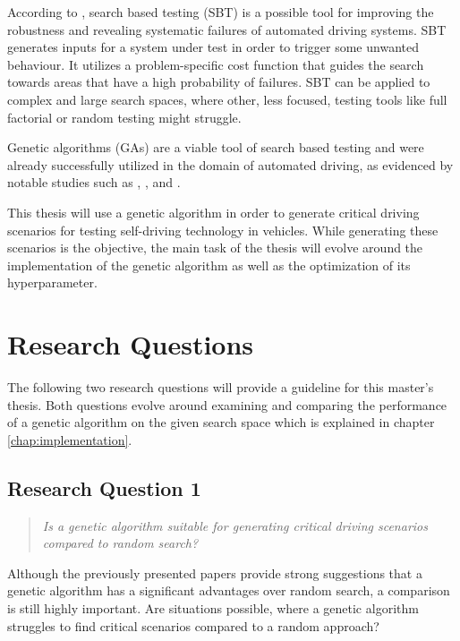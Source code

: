 According to \cite{kluck_search-based_2022}, search based testing (SBT) is a possible tool for improving the robustness and revealing systematic failures of automated driving systems. SBT generates inputs for a system under test in order to trigger some unwanted behaviour. It utilizes a problem-specific cost function that guides the search towards areas that have a high probability of failures. SBT can be applied to complex and large search spaces, where other, less focused, testing tools like full factorial or random testing might struggle.

Genetic algorithms (GAs) are a viable tool of search based testing and were already successfully utilized in the domain of automated driving, as evidenced by notable studies such as \cite{klampfl_using_nodate}, \cite{felbinger_comparing_2019}, \cite{kaufmann_critical_2021} and \cite{almanee_scenorita_2021}. 

This thesis will use a genetic algorithm in order to generate critical driving scenarios for testing self-driving technology in vehicles. While generating these scenarios is the objective, the main task of the thesis will evolve around the implementation of the genetic algorithm as well as the optimization of its hyperparameter.

\section{Research Questions}
The following two research questions will provide a guideline for this master's thesis. Both questions evolve around examining and comparing the performance of a genetic algorithm on the given search space which is explained in chapter \ref{chap:implementation}.

\subsection{Research Question 1}
\begin{quote}
	\begin{em}
		\textit{Is a genetic algorithm suitable for generating critical driving scenarios compared to random search?}
	\end{em}
\end{quote}

Although the previously presented papers provide strong suggestions that a genetic algorithm has a significant advantages over random search, a comparison is still highly important. Are situations possible, where a genetic algorithm struggles to find critical scenarios compared to a random approach?



